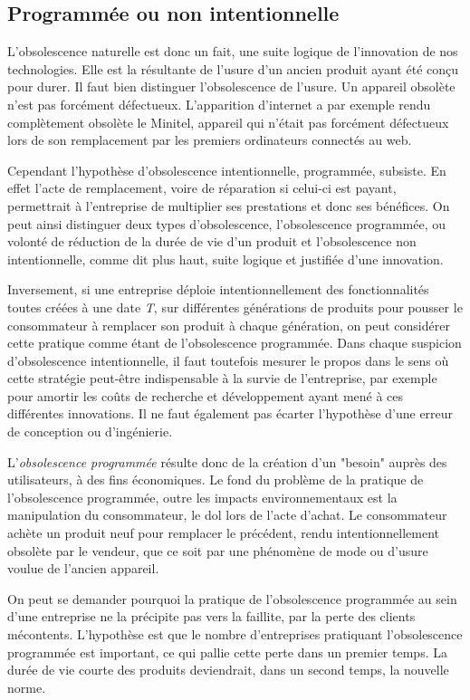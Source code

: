 \subsection{Programmée ou non intentionnelle}

L'obsolescence naturelle est donc un fait, une suite logique de l'innovation de nos technologies. Elle est la résultante de l'usure d'un ancien produit ayant été conçu pour durer.
Il faut bien distinguer l’obsolescence de l’usure. Un appareil obsolète n’est pas forcément défectueux. L’apparition d’internet a par exemple rendu complètement obsolète le Minitel, appareil qui n'était pas forcément défectueux lors de son remplacement par les premiers ordinateurs connectés au web. 

\bigbreak
Cependant l'hypothèse d'obsolescence intentionnelle, programmée, subsiste. 
En effet l'acte de remplacement, voire de réparation si celui-ci est payant, permettrait à l'entreprise de multiplier ses prestations et donc ses bénéfices. 
On peut ainsi distinguer deux types d'obsolescence, l'obsolescence programmée, ou volonté de réduction de la durée de vie d’un produit et l'obsolescence non intentionnelle, comme dit plus haut, suite logique et justifiée d’une innovation.

\bigbreak
Inversement, si une entreprise déploie intentionnellement des fonctionnalités toutes créées à une date \textit{T}, sur différentes générations de produits pour pousser le consommateur à remplacer son produit à chaque génération, on peut considérer cette pratique comme étant de l'obsolescence programmée. Dans chaque suspicion d’obsolescence intentionnelle, il faut toutefois mesurer le propos dans le sens où cette stratégie peut-être indispensable à la survie de l’entreprise, par exemple pour amortir les coûts de recherche et développement ayant mené à ces différentes innovations. Il ne faut également pas écarter l’hypothèse d’une erreur de conception ou d'ingénierie.

\medbreak
L'\textit{obsolescence programmée} résulte donc de la création d'un "besoin" auprès des utilisateurs, à des fins économiques. Le fond du problème de la pratique de l'obsolescence programmée, outre les impacts environnementaux est la manipulation du consommateur, le dol lors de l'acte d'achat. Le consommateur achète un produit neuf pour remplacer le précédent, rendu intentionnellement obsolète par le vendeur, que ce soit par une phénomène de mode ou d'usure voulue de l’ancien appareil.%

\bigbreak
On peut se demander pourquoi la pratique de l’obsolescence programmée au sein d’une entreprise ne la précipite pas vers la faillite, par la perte des clients mécontents. L’hypothèse est que le nombre d’entreprises pratiquant l’obsolescence programmée est important, ce qui pallie cette perte dans un premier temps. La durée de vie courte des produits deviendrait, dans un second temps, la nouvelle norme.
